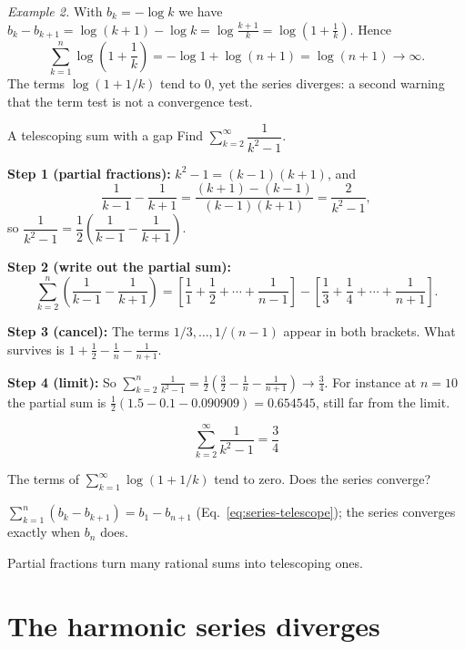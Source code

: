 \emph{Example 2.} With $b_k=-\log k$ we have $b_k-b_{k+1}=\log(k+1)-\log k=\log\frac{k+1}{k}=\log\left(1+\frac1k\right)$. Hence
\[
\sum_{k=1}^n\log\left(1+\frac1k\right)=-\log1+\log(n+1)=\log(n+1)\to\infty .
\]
The terms $\log(1+1/k)$ tend to $0$, yet the series diverges: a second warning that the term test is not a convergence test.

\begin{sample}{A telescoping sum with a gap}
Find $\sum_{k=2}^{\infty}\dfrac{1}{k^2-1}$.

\textbf{Step 1 (partial fractions):} $k^2-1=(k-1)(k+1)$, and
\[
\frac{1}{k-1}-\frac1{k+1}=\frac{(k+1)-(k-1)}{(k-1)(k+1)}=\frac{2}{k^2-1},
\]
so $\dfrac1{k^2-1}=\dfrac12\left(\dfrac1{k-1}-\dfrac1{k+1}\right)$.

\textbf{Step 2 (write out the partial sum):}
\[
\sum_{k=2}^{n}\left(\frac1{k-1}-\frac1{k+1}\right)
=\left[\frac11+\frac12+\cdots+\frac1{n-1}\right]-\left[\frac13+\frac14+\cdots+\frac1{n+1}\right].
\]

\textbf{Step 3 (cancel):} The terms $1/3,\dots,1/(n-1)$ appear in both brackets. What survives is $1+\tfrac12-\tfrac1n-\tfrac1{n+1}$.

\textbf{Step 4 (limit):} So $\sum_{k=2}^n\frac1{k^2-1}=\frac12\left(\frac32-\frac1n-\frac1{n+1}\right)\to\frac34$. For instance at $n=10$ the partial sum is $\tfrac12(1.5-0.1-0.090909)=0.654545$, still far from the limit.

\[\boxed{\sum_{k=2}^\infty\frac{1}{k^2-1}=\frac34}\]
\end{sample}

\begin{checkpoint}
The terms of $\sum_{k=1}^\infty\log(1+1/k)$ tend to zero. Does the series converge?
\end{checkpoint}

\begin{keyideas}
\item $\sum_{k=1}^n(b_k-b_{k+1})=b_1-b_{n+1}$ (Eq.~\eqref{eq:series-telescope}); the series converges exactly when $b_n$ does.
\item Partial fractions turn many rational sums into telescoping ones.
\end{keyideas}

\section{The harmonic series diverges}\label{sec:series-harmonic}

